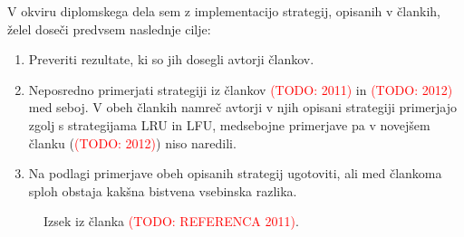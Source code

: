 \documentclass[a4paper, 12pt]{book}
\newcommand{\TODO}[1]{\textcolor{red}{(TODO: #1)}}
\begin{document}
\begin{minipage}{\textwidth}

V okviru diplomskega dela sem z implementacijo strategij, opisanih v
člankih, želel doseči predvsem naslednje cilje:
\label{cilji}

\begin{enumerate}
\item Preveriti rezultate, ki so jih dosegli avtorji člankov.

\item Neposredno primerjati strategiji iz člankov \TODO{2011} in
\TODO{2012} med seboj. V obeh člankih namreč avtorji v njih opisani
strategiji primerjajo zgolj s strategijama LRU in LFU, medsebojne
primerjave pa v novejšem članku (\TODO{2012}) niso naredili.

\item Na podlagi primerjave obeh opisanih strategij ugotoviti, ali med
član\-koma sploh obstaja kakšna bistvena vsebinska razlika.
\end{enumerate}

\end{minipage}

\begin{figure}
  \begin{center}
  \end{center}
  \caption{Izsek iz članka \TODO{REFERENCA 2011}.}
  \label{pic2011}
\end{figure}
\end{document}
